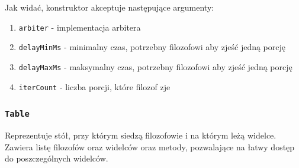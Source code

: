 \documentclass[11pt]{article}
\providecommand{\tightlist}{%
      \setlength{\itemsep}{0pt}\setlength{\parskip}{0pt}}
\begin{document}
Jak widać, konstruktor akceptuje następujące argumenty:

\begin{enumerate}
\def\labelenumi{\arabic{enumi}.}
\tightlist
\item
  \texttt{arbiter} - implementacja arbitera
\item
  \texttt{delayMinMs} - minimalny czas, potrzebny filozofowi aby zjeść
  jedną porcję
\item
  \texttt{delayMaxMs} - maksymalny czas, potrzebny filozofowi aby zjeść
  jedną porcję
\item
  \texttt{iterCount} - liczba porcji, które filozof zje
\end{enumerate}

    \hypertarget{table}{%
\subsubsection{\texorpdfstring{\texttt{Table}}{Table}}\label{table}}

Reprezentuje stół, przy którym siedzą filozofowie i na którym leżą
widelce. Zawiera listę filozofów oraz widelców oraz metody, pozwalające
na łatwy dostęp do poszczególnych widelców.
\end{document}
